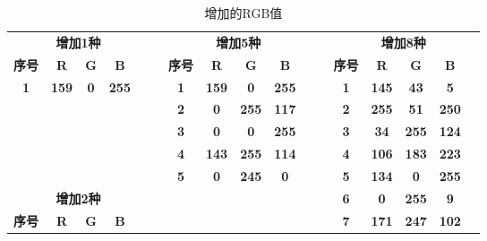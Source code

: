 \begin{table}[H]
	\centering
	\caption{增加的RGB值}
	\begin{tabular}{|ccccc|r|ccccr|r|ccccc|}
		\multicolumn{5}{c}{\textbf{增加1种}}     & \multicolumn{1}{r}{} & \multicolumn{5}{c}{\textbf{增加5种}}     & \multicolumn{1}{r}{} & \multicolumn{5}{c}{\textbf{增加8种}} \\
		\cmidrule{1-5}\cmidrule{7-11}\cmidrule{13-17}    \textbf{序号} & \textbf{R} & \textbf{G} & \textbf{B} &       &       & \textbf{序号} & \textbf{R} & \textbf{G} & \textbf{B} &       &       & \textbf{序号} & \textbf{R} & \textbf{G} & \textbf{B} &  \\
		\textbf{1} & \textbf{159} & \textbf{0} & \textbf{255} & \cellcolor[rgb]{ .624,  0,  1} &       & \textbf{1} & \textbf{159} & \textbf{0} & \textbf{255} & \cellcolor[rgb]{ .624,  0,  1} &       & \textbf{1} & \textbf{145} & \textbf{43} & \textbf{5} & \cellcolor[rgb]{ .569,  .169,  .02} \\
		\cmidrule{1-5}    \multicolumn{1}{r}{} &       &       &       & \multicolumn{1}{r}{} &       & \textbf{2} & \textbf{0} & \textbf{255} & \textbf{117} & \cellcolor[rgb]{ 0,  1,  .459} &       & \textbf{2} & \textbf{255} & \textbf{51} & \textbf{250} & \cellcolor[rgb]{ 1,  .2,  .98} \\
		\multicolumn{1}{r}{} &       &       &       & \multicolumn{1}{r}{} &       & \textbf{3} & \textbf{0} & \textbf{0} & \textbf{255} & \cellcolor[rgb]{ 0,  0,  1} &       & \textbf{3} & \textbf{34} & \textbf{255} & \textbf{124} & \cellcolor[rgb]{ .133,  1,  .486} \\
		\multicolumn{1}{r}{} &       &       &       & \multicolumn{1}{r}{} &       & \textbf{4} & \textbf{143} & \textbf{255} & \textbf{114} & \cellcolor[rgb]{ .561,  1,  .447} &       & \textbf{4} & \textbf{106} & \textbf{183} & \textbf{223} & \cellcolor[rgb]{ .416,  .718,  .875} \\
		\multicolumn{1}{r}{} &       &       &       & \multicolumn{1}{r}{} &       & \textbf{5} & \textbf{0} & \textbf{245} & \textbf{0} & \cellcolor[rgb]{ 0,  .961,  0} &       & \textbf{5} & \textbf{134} & \textbf{0} & \textbf{255} & \cellcolor[rgb]{ .525,  0,  1} \\
		\cmidrule{7-11}    \multicolumn{5}{c}{\textbf{增加2种}}     & \multicolumn{1}{r}{} &       &       &       &       & \multicolumn{1}{r}{} &       & \textbf{6} & \textbf{0} & \textbf{255} & \textbf{9} & \cellcolor[rgb]{ 0,  1,  .035} \\
		\cmidrule{1-5}    \textbf{序号} & \textbf{R} & \textbf{G} & \textbf{B} &       & \multicolumn{1}{r}{} &       &       &       &       & \multicolumn{1}{r}{} &       & \textbf{7} & \textbf{171} & \textbf{247} & \textbf{102} & \cellcolor[rgb]{ .671,  .969,  .4} \\

\end{tabular}
\end{table}
